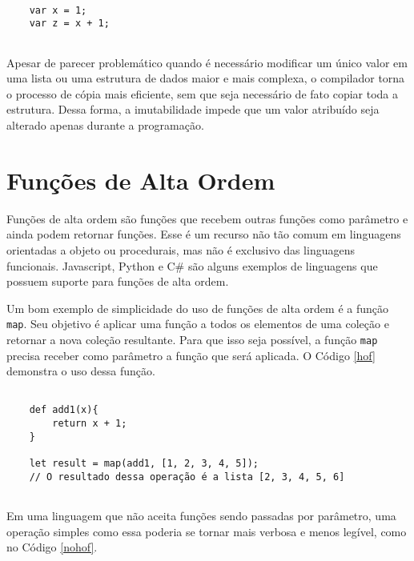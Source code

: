 \begin{lstlisting}[caption={Exemplo de Código Imutável. Fonte: O Autor (2021)},label=imutablevar]

    var x = 1;
    var z = x + 1;


\end{lstlisting}

Apesar de parecer problemático quando é necessário 
modificar um único valor em uma lista ou uma estrutura 
de dados maior e mais complexa, o compilador torna o 
processo de cópia mais eficiente, sem que seja 
necessário de fato copiar toda a estrutura\cite{functionalscala}. 
Dessa forma, a imutabilidade impede que um valor 
atribuído seja alterado apenas durante a 
programação.


\section{Funções de Alta Ordem}

Funções de alta ordem são funções que recebem 
outras funções como parâmetro e ainda podem 
retornar funções\cite{realworldhaskell, functionalscala}. 
Esse é um recurso 
não tão comum em linguagens orientadas a 
objeto ou procedurais, mas não é exclusivo das 
linguagens funcionais. Javascript\cite{eloquentjs}, 
Python\cite{denerocomposing} e C\#\cite{buonannofunctcsharp}
são alguns exemplos de linguagens que possuem suporte 
para funções de alta ordem.

Um bom exemplo de simplicidade do uso de 
funções de alta ordem é a função \texttt{map}\cite{hofscala}. Seu objetivo 
é aplicar uma função a todos os elementos de uma 
coleção e retornar a nova coleção resultante. 
Para que isso seja possível, a função \texttt{map} precisa 
receber como parâmetro a função que será aplicada. 
O Código \ref{hof} demonstra o uso dessa função.

\begin{lstlisting}[caption={Exemplo de Função de Alta Ordem. Fonte: O Autor (2021)},label=hof]

    def add1(x){
        return x + 1;
    }

    let result = map(add1, [1, 2, 3, 4, 5]);
    // O resultado dessa operação é a lista [2, 3, 4, 5, 6]
        

\end{lstlisting}

Em uma linguagem que não aceita funções sendo 
passadas por parâmetro, uma operação simples como 
essa poderia se tornar mais verbosa e menos legível, 
como no Código \ref{nohof}.

